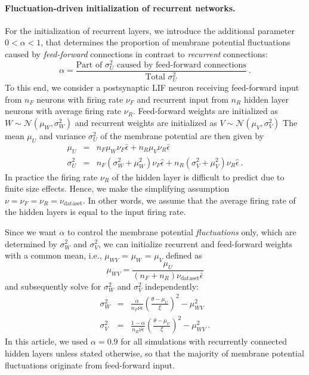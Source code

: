 \documentclass[11pt,a4paper]{article}
\begin{document}
  \paragraph{Fluctuation-driven initialization of recurrent networks.} For the
initialization of recurrent layers, we introduce the additional parameter $0 <
\alpha < 1$, that determines the proportion of membrane potential fluctuations
caused by \emph{feed-forward} connections in contrast to \emph{recurrent}
connections:
\begin{equation}
    \alpha = \frac{\text{Part of }\sigma_U^2 \text{ caused by feed-forward connections}}{\text{Total }\sigma_U^2}~.
    \label{eq:alpha_nd}
\end{equation}
To this end, we consider a postsynaptic LIF neuron receiving
feed-forward input from $n_F$ neurons with firing rate $\nu_F$ and recurrent
input from $n_R$ hidden layer neurons with average firing rate $\nu_R$.
Feed-forward weights are initialized as $W \sim \mathcal{N}(\mu_W, \sigma_W^2)$
and recurrent weights are initialized as $V \sim \mathcal{N}(\mu_V,
\sigma_V^2)$ The mean $\mu_U$ and variance $\sigma_U^2$ of the membrane
potential are then given by
\begin{eqnarray}
\mu_U &=& n_F \mu_W \nu_{F}\bar\epsilon + n_R \mu_V \nu_{R}\bar\epsilon \\
\sigma^2_{U}&=&n_F(\sigma_{W}^2 + \mu_W^2)\nu_F\hat\epsilon + n_R(\sigma_{V}^2+\mu_V^2)\nu_R\hat\epsilon~.
\end{eqnarray}
In practice the firing rate $\nu_R$ of the hidden layer is
difficult to predict due to finite size effects. 
Hence, we make the simplifying assumption $\nu = \nu_F
= \nu_R = \nu_{\text{dataset}}$. In other words, we assume that the average
firing rate of the hidden layers is equal to the input firing rate.


Since we want $\alpha$ to control the membrane potential \textit{fluctuations}
only, which are determined by $\sigma_W^2$ and $\sigma_V^2$, we can initialize
recurrent and feed-forward weights with a common mean, i.e., $\mu_{WV}$ =
$\mu_W$ = $\mu_V$
defined as
\begin{equation}
\label{eq:muWV_nondale_rec}
\mu_{WV} = \frac{\mu_U}{\left(n_F + n_R\right) \nu_{\text{dataset}}
\bar\epsilon}
\end{equation}
and subsequently solve for $\sigma_W^2$ and $\sigma_V^2$ independently:
\begin{eqnarray}
\label{eq:sigmaW_nondale_rec}
\sigma^2_W &=& \frac{\alpha}{n_F \nu \hat\epsilon} \left(\frac{\theta -
\mu_U}{\xi} \right)^2 - \mu_{WV}^2
\\	
\label{eq:sigmaV_nondale_rec}
\sigma^2_V &=& \frac{1-\alpha}{n_R \nu \hat\epsilon} \left(\frac{\theta -
\mu_U}{\xi} \right)^2 - \mu_{WV}^2~.
\end{eqnarray}
In this article, we used $\alpha=0.9$ for all simulations with recurrently connected
hidden layers unless stated otherwise, so that the majority of membrane potential fluctuations originate from
feed-forward input.
  
\end{document}
